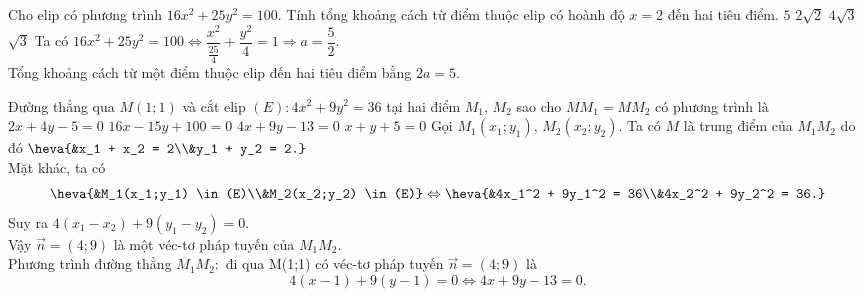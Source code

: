 \begin{ex}%
	Cho elip có phương trình $16x^2 + 25y^2 = 100$. Tính tổng khoảng cách từ điểm thuộc elip có hoành độ $x = 2$ đến hai tiêu điểm.
	\choice
	{\True $5$}
	{$2\sqrt{2}$}
	{$4\sqrt{3}$}
	{$\sqrt{3}$}
	\loigiai
	{
		Ta có $16x^2 + 25y^2 = 100 \Leftrightarrow \dfrac{x^2}{\tfrac{25}{4}} + \dfrac{y^2}{4} = 1 \Rightarrow a = \dfrac{5}{2}$.\\
		Tổng khoảng cách từ một điểm thuộc elip đến hai tiêu điểm bằng $2a = 5$.
	}
\end{ex}

\begin{ex}%
	Đường thẳng qua $M(1;1)$ và cắt elip $(E)\colon 4x^2 + 9y^2 = 36$ tại hai điểm $M_1$, $M_2$ sao cho $MM_1 = MM_2$ có phương trình là 
	\choice
	{$2x + 4y - 5 = 0$}
	{$16x - 15y + 100 = 0$}
	{\True $4x + 9y - 13 = 0$}
	{$x + y + 5 = 0$}
	\loigiai
	{
		Gọi $M_1(x_1;y_1)$, $M_2(x_2;y_2)$. Ta có $M$ là trung điểm của $M_1M_2$ do đó $\heva{&x_1 + x_2 = 2\\&y_1 + y_2 = 2.}$\\
		Mặt khác, ta có
		$$ \heva{&M_1(x_1;y_1) \in (E)\\&M_2(x_2;y_2) \in (E)} \Leftrightarrow \heva{&4x_1^2 + 9y_1^2 = 36\\&4x_2^2 + 9y_2^2 = 36.} $$
		Suy ra $4(x_1 - x_2) + 9(y_1 - y_2) = 0$.\\
		Vậy $\overrightarrow{n} = (4;9)$ là một véc-tơ pháp tuyến của $M_1M_2$.\\
		Phương trình đường thẳng $M_1M_2\colon$ đi qua M(1;1) có véc-tơ pháp tuyến $\overrightarrow{n} = (4;9)$ là
		$$ 4(x - 1) + 9(y - 1) = 0 \Leftrightarrow 4x + 9y - 13 = 0. $$
	}
\end{ex}


